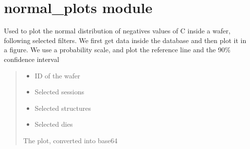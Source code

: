 \documentclass[letterpaper,10pt,english]{sphinxmanual}
\begin{document}
\sphinxstepscope


\section{normal\_plots module}
\label{\detokenize{normal_plots:module-normal_plots}}\label{\detokenize{normal_plots:normal-plots-module}}\label{\detokenize{normal_plots::doc}}

\begin{fulllineitems}
\label{\detokenize{normal_plots:normal_plots.C_normal_distrib_neg}}
\pysigstartsignatures
{}
\pysigstopsignatures
\sphinxAtStartPar
Used to plot the normal distribution of negatives values of C inside a wafer, following selected filters.
We first get data inside the database and then plot it in a figure. We use a probability scale, and plot the reference line and the 90\% confidence interval
\begin{quote}\begin{description}
\begin{itemize}
\item {} 
\sphinxAtStartPar
{} \textendash{} ID of the wafer

\item {} 
\sphinxAtStartPar
{} \textendash{} Selected sessions

\item {} 
\sphinxAtStartPar
{} \textendash{} Selected structures

\item {} 
\sphinxAtStartPar
{} \textendash{} Selected dies

\end{itemize}

\sphinxAtStartPar
The plot, converted into base64

\end{description}\end{quote}

\end{fulllineitems}
\end{document}
